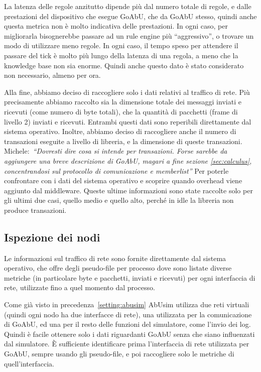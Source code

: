 \documentclass[12pt, a4paper]{article}
\newcommand{\michele}[1]{{\color{red}Michele:~}{\itshape``{#1}''}}
\begin{document}
La latenza delle regole anzitutto dipende più dal numero totale di regole, e dalle prestazioni del dispositivo che esegue GoAbU, che da GoAbU stesso, quindi anche questa metrica non è molto indicativa delle prestazioni.
In ogni caso, per migliorarla bisognerebbe passare ad un rule engine più ``aggressivo'', o trovare un modo di utilizzare meno regole.
In ogni caso, il tempo speso per attendere il passare del tick è molto più lungo della latenza di una regola, a meno che la knowledge base non sia enorme.
Quindi anche questo dato è stato considerato non necessario, almeno per ora.

Alla fine, abbiamo deciso di raccogliere solo i dati relativi al traffico di rete. Più precisamente abbiamo raccolto sia la dimensione totale dei messaggi inviati e ricevuti (come numero di byte totali), che la quantità di pacchetti (frame di livello 2) inviati e ricevuti. Entrambi questi dati sono reperibili direttamente dal sistema operativo.
Inoltre, abbiamo deciso di raccogliere anche il numero di transazioni eseguite a livello di libreria, e la dimensione di queste transazioni. \michele{Dovresti dire cosa si intende per transazioni. Forse sarebbe da aggiungere una breve descrizione di GoAbU, magari a fine sezione \ref{sec:calculus}, concentrandosi sul protocollo di comunicazione e memberlist} Per poterle confrontare con i dati del sistema operativo e scoprire quando overhead viene aggiunto dal middleware.
Queste ultime informazioni sono state raccolte solo per gli ultimi due casi, quello medio e quello alto, perché in idle la libreria non produce transazioni.

\subsection{Ispezione dei nodi}

Le informazioni sul traffico di rete sono fornite direttamente dal sistema operativo, che offre degli pseudo-file per processo dove sono listate diverse metriche (in particolare byte e pacchetti, inviati e ricevuti) per ogni interfaccia di rete, utilizzate fino a quel momento dal processo.

Come già visto in precedenza~\ref{setting:abusim} AbUsim utilizza due reti virtuali (quindi ogni nodo ha due interfacce di rete), una utilizzata per la comunicazione di GoAbU, ed una per il resto delle funzioni del simulatore, come l'invio dei log.
Quindi è facile ottenere solo i dati riguardanti GoAbU senza che siano influenzati dal simulatore. È sufficiente identificare prima l'interfaccia di rete utilizzata per GoAbU, sempre usando gli pseudo-file, e poi raccogliere solo le metriche di quell'interfaccia.
\end{document}
